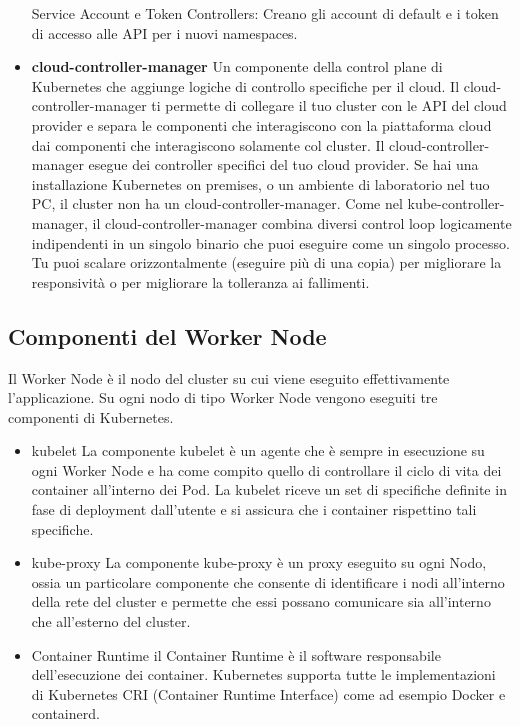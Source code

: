 \begin{itemize}
    Service Account e Token Controllers: Creano gli account di default e i token di accesso alle API per i nuovi namespaces.
    \item\textbf{cloud-controller-manager}
    Un componente della control plane di Kubernetes che aggiunge logiche di controllo specifiche per il cloud. Il cloud-controller-manager ti permette di collegare il tuo cluster con le API del cloud provider e separa le componenti che interagiscono con la piattaforma cloud dai componenti che interagiscono solamente col cluster.
    Il cloud-controller-manager esegue dei controller specifici del tuo cloud provider. Se hai una installazione Kubernetes on premises, o un ambiente di laboratorio nel tuo PC, il cluster non ha un cloud-controller-manager.
    Come nel kube-controller-manager, il cloud-controller-manager combina diversi control loop logicamente indipendenti in un singolo binario che puoi eseguire come un singolo processo. Tu puoi scalare orizzontalmente (eseguire più di una copia) per migliorare la responsività o per migliorare la tolleranza ai fallimenti.
\end{itemize}
\subsection{Componenti del Worker Node}
Il Worker Node è il nodo del cluster su cui viene eseguito effettivamente l'applicazione. Su ogni nodo di tipo Worker Node vengono eseguiti tre componenti di Kubernetes.
\begin{itemize}
    \item{kubelet}
    La componente kubelet è un agente che è sempre in esecuzione su ogni Worker Node e ha come compito quello di controllare il ciclo di vita dei container all'interno dei Pod. La kubelet riceve un set di specifiche definite in fase di deployment dall'utente  e si assicura che i container rispettino tali specifiche.
    \item{kube-proxy}
    La componente kube-proxy è un proxy eseguito su ogni Nodo, ossia un particolare componente che consente di identificare i nodi all'interno della rete del cluster e permette che essi possano comunicare sia all'interno che all'esterno del cluster.
    \item{Container Runtime} il Container Runtime è il software responsabile dell'esecuzione dei container. Kubernetes supporta tutte le implementazioni di Kubernetes CRI (Container Runtime Interface) come ad esempio Docker e containerd.
\end{itemize}
